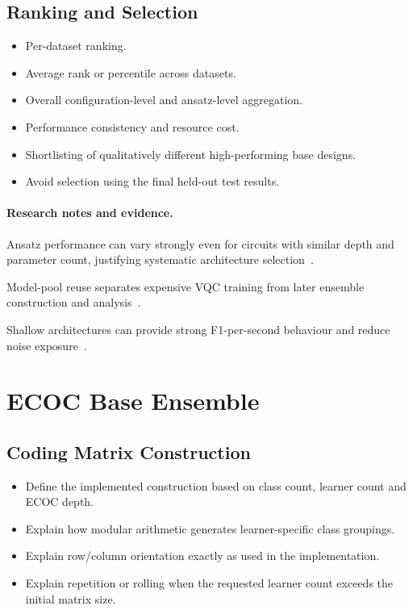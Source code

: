 \documentclass[]{UCD_CS_MSc_AAI_Report}
\newcommand{\challenge}[1]{{\color{red}#1}}
\newcommand{\method}[1]{{\color{cyan!80!black}#1}}
\newcommand{\result}[1]{{\color{green!60!black}#1}}
\newcommand{\researchnotes}{\paragraph{Research notes and evidence.}}
\begin{document}
\subsection{Ranking and Selection}
\begin{itemize}
    \item Per-dataset ranking.
    \item Average rank or percentile across datasets.
    \item Overall configuration-level and ansatz-level aggregation.
    \item Performance consistency and resource cost.
    \item Shortlisting of qualitatively different high-performing base designs.
    \item Avoid selection using the final held-out test results.
\end{itemize}

\researchnotes
\begin{itemize}
    \challenge{\item Ansatz performance can vary strongly even for circuits with similar depth and parameter count, justifying systematic architecture selection~\cite{pinto_composing_2026}.}
    \method{\item Model-pool reuse separates expensive VQC training from later ensemble construction and analysis~\cite{pinto_composing_2026}.}
    \result{\item Shallow architectures can provide strong F1-per-second behaviour and reduce noise exposure~\cite{pinto_composing_2026}.}
\end{itemize}

\section{ECOC Base Ensemble}
\label{sec:method-ecoc}

\subsection{Coding Matrix Construction}
\begin{itemize}
    \item Define the implemented construction based on class count, learner count and ECOC depth.
    \item Explain how modular arithmetic generates learner-specific class groupings.
    \item Explain row/column orientation exactly as used in the implementation.
    \item Explain repetition or rolling when the requested learner count exceeds the initial matrix size.
\end{itemize}
\end{document}
